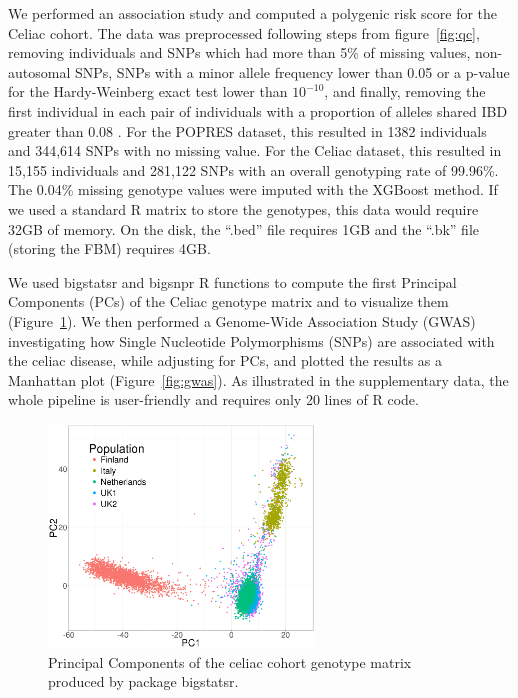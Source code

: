 \documentclass{bioinfo}
\begin{document}
We performed an association study and computed a polygenic risk score for the Celiac cohort. 
The data was preprocessed following steps from figure~\ref{fig:qc}, removing individuals and SNPs which had more than 5\% of missing values, non-autosomal SNPs, SNPs with a minor allele frequency lower than 0.05 or a p-value for the Hardy-Weinberg exact test lower than $10^{-10}$, and finally, removing the first individual in each pair of individuals with a proportion of alleles shared IBD greater than 0.08 \cite[]{Purcell2007}. 
For the POPRES dataset, this resulted in 1382 individuals and 344,614 SNPs with no missing value.
For the Celiac dataset, this resulted in 15,155 individuals and 281,122 SNPs with an overall genotyping rate of 99.96\%. The 0.04\% missing genotype values were imputed with the XGBoost method. If we used a standard R matrix to store the genotypes, this data would require 32GB of memory. On the disk, the ``.bed'' file requires 1GB and the ``.bk'' file (storing the FBM) requires 4GB. 

We used bigstatsr and bigsnpr R functions to compute the first Principal Components (PCs) of the Celiac genotype matrix and to visualize them (Figure~\ref{fig:pca}). We then performed a Genome-Wide Association Study (GWAS) investigating how Single Nucleotide Polymorphisms (SNPs) are associated with the celiac disease, while adjusting for PCs, and plotted the results as a Manhattan plot (Figure~\ref{fig:gwas}). As illustrated in the supplementary data, the whole pipeline is user-friendly and requires only 20 lines of R code.

\begin{figure}[!tpb]
\centerline{\includegraphics[width=200pt]{celiac-pca}}
\caption{Principal Components of the celiac cohort genotype matrix produced by package bigstatsr.}\label{fig:pca}
\end{figure}
\end{document}
